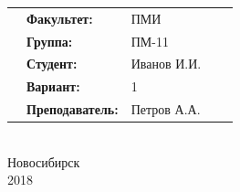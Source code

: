 \documentclass[a4paper,12pt]{article}
\begin{document}
\begin{center}
{\begin{tabular}{cllp{1.5cm}p{1.5cm}}
& \textbf{Факультет:} & ПМИ & & \\[1.25ex]
& \textbf{Группа:} & ПМ-11 & & \\[1.25ex]
& \textbf{Студент:} & Иванов И.И. & & \\[1.25ex]
& \textbf{Вариант:} & 1 & & \\[1.25ex]
& \textbf{Преподаватель:} & Петров А.А. & & \\[1.25ex]
\end{tabular}} \\
\hfill \break
\hfill \break
\hfill \break
\hfill \break
\hfill \break
\large{Новосибирск\\2018}
\end{center}
\thispagestyle{empty} %
\newpage 
\setcounter{page}{1} %

\end{document}
